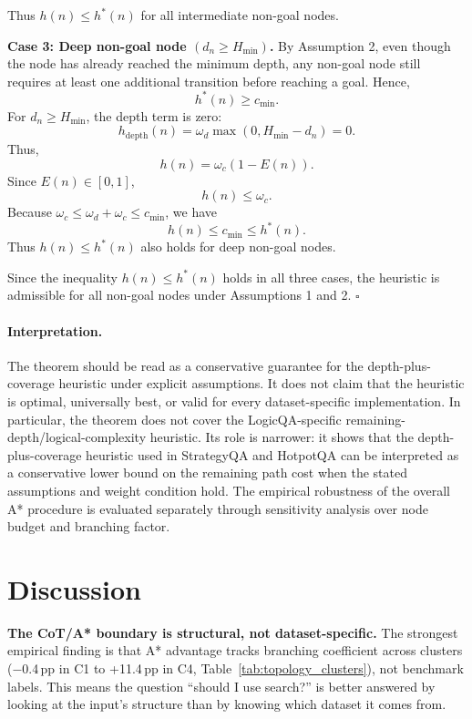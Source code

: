 \documentclass[11pt]{article}
\begin{document}
Thus \(h(n)\leq h^*(n)\) for all intermediate non-goal nodes.

\textbf{Case 3: Deep non-goal node \((d_n\geq H_{\min})\).}
By Assumption 2, even though the node has already reached the minimum depth, any non-goal node still requires at least one additional transition before reaching a goal. Hence,
\[
h^*(n)\geq c_{\min}.
\]
For \(d_n\geq H_{\min}\), the depth term is zero:
\[
h_{\mathrm{depth}}(n)=\omega_d\max(0,H_{\min}-d_n)=0.
\]
Thus,
\[
h(n)=\omega_c(1-E(n)).
\]
Since \(E(n)\in[0,1]\),
\[
h(n)\leq \omega_c.
\]
Because \(\omega_c\leq \omega_d+\omega_c\leq c_{\min}\), we have
\[
h(n)\leq c_{\min}\leq h^*(n).
\]
Thus \(h(n)\leq h^*(n)\) also holds for deep non-goal nodes.

Since the inequality \(h(n)\leq h^*(n)\) holds in all three cases, the heuristic is admissible for all non-goal nodes under Assumptions 1 and 2.
\(\square\)

\paragraph{Interpretation.}
The theorem should be read as a conservative guarantee for the depth-plus-coverage heuristic under explicit assumptions. It does not claim that the heuristic is optimal, universally best, or valid for every dataset-specific implementation. In particular, the theorem does not cover the LogicQA-specific remaining-depth/logical-complexity heuristic. Its role is narrower: it shows that the depth-plus-coverage heuristic used in StrategyQA and HotpotQA can be interpreted as a conservative lower bound on the remaining path cost when the stated assumptions and weight condition hold. The empirical robustness of the overall A* procedure is evaluated separately through sensitivity analysis over node budget and branching factor.



\section{Discussion}
\label{sec:discussion}


\textbf{The CoT/A* boundary is structural, not dataset-specific.}
The strongest empirical finding is that A* advantage tracks branching coefficient across clusters ($-$0.4\,pp in C1 to +11.4\,pp in C4, Table~\ref{tab:topology_clusters}), not benchmark labels. This means the question ``should I use search?'' is better answered by looking at the input's structure than by knowing which dataset it comes from.
\end{document}
